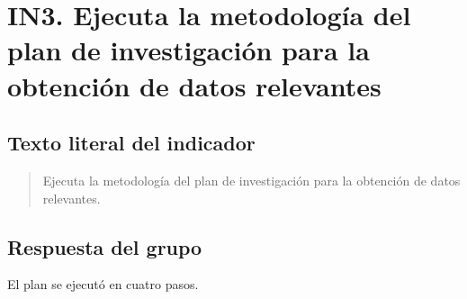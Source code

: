 \section*{IN3. Ejecuta la metodología del plan de investigación para la obtención de datos relevantes}

\subsection*{Texto literal del indicador}
\begin{quote}
Ejecuta la metodología del plan de investigación para la obtención de datos relevantes.
\end{quote}

\subsection*{Respuesta del grupo}
El plan se ejecutó en cuatro pasos.

